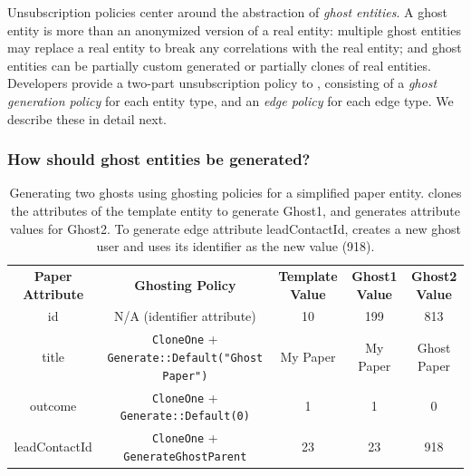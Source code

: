 Unsubscription policies center around the abstraction of \emph{ghost entities}. A ghost entity is
more than an anonymized version of a real entity: multiple ghost
entities may replace a real entity to break any correlations with the real entity; and ghost entities can be
partially custom generated or partially clones of real entities.
Developers provide a two-part unsubscription policy to \sys, consisting of a \emph{ghost
generation policy} for each entity type, and an \emph{edge policy} for each edge type. We
describe these in detail next.

\subsubsection{How should ghost entities be generated?}
\label{sec:ghosting}

\begin{table}[t!]
    \centering
    \footnotesize
\begin{tabular}{@{}ccccc@{}}
\textbf{Paper Attribute} & \textbf{Ghosting Policy} & \textbf{Template Value} & \textbf{Ghost1 Value} & \textbf{Ghost2 Value} 
  \\ \cmidrule(r){1-5}
    {id} & N/A (identifier attribute) & 10 & 199 & 813 \\
{title} & \texttt{CloneOne} + \texttt{Generate::Default("Ghost Paper")} & My Paper & My
    Paper & Ghost Paper \\
{outcome} & \texttt{CloneOne} + \texttt{Generate::Default(0)} & 1 & 1 & 0 \\
{leadContactId} & \texttt{CloneOne} + \texttt{GenerateGhostParent} & 23 & 23 & 918 \\
\end{tabular}
    \caption{Generating two ghosts using ghosting policies for a simplified paper entity.
    \sys clones the attributes of the template entity to generate Ghost1, and generates
    attribute values for Ghost2. To generate edge attribute leadContactId, \sys creates a new ghost user and uses its identifier as the new value (918).}
    \label{tab:ghosting}
\end{table}

